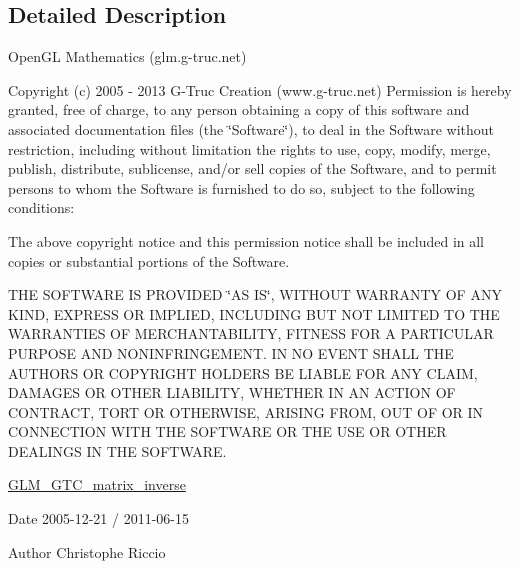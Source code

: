 \subsection{Detailed Description}
Open\+G\+L Mathematics (glm.\+g-\/truc.\+net)

Copyright (c) 2005 -\/ 2013 G-\/\+Truc Creation (www.\+g-\/truc.\+net) Permission is hereby granted, free of charge, to any person obtaining a copy of this software and associated documentation files (the \char`\"{}\+Software\char`\"{}), to deal in the Software without restriction, including without limitation the rights to use, copy, modify, merge, publish, distribute, sublicense, and/or sell copies of the Software, and to permit persons to whom the Software is furnished to do so, subject to the following conditions\+:

The above copyright notice and this permission notice shall be included in all copies or substantial portions of the Software.

T\+H\+E S\+O\+F\+T\+W\+A\+R\+E I\+S P\+R\+O\+V\+I\+D\+E\+D \char`\"{}\+A\+S I\+S\char`\"{}, W\+I\+T\+H\+O\+U\+T W\+A\+R\+R\+A\+N\+T\+Y O\+F A\+N\+Y K\+I\+N\+D, E\+X\+P\+R\+E\+S\+S O\+R I\+M\+P\+L\+I\+E\+D, I\+N\+C\+L\+U\+D\+I\+N\+G B\+U\+T N\+O\+T L\+I\+M\+I\+T\+E\+D T\+O T\+H\+E W\+A\+R\+R\+A\+N\+T\+I\+E\+S O\+F M\+E\+R\+C\+H\+A\+N\+T\+A\+B\+I\+L\+I\+T\+Y, F\+I\+T\+N\+E\+S\+S F\+O\+R A P\+A\+R\+T\+I\+C\+U\+L\+A\+R P\+U\+R\+P\+O\+S\+E A\+N\+D N\+O\+N\+I\+N\+F\+R\+I\+N\+G\+E\+M\+E\+N\+T. I\+N N\+O E\+V\+E\+N\+T S\+H\+A\+L\+L T\+H\+E A\+U\+T\+H\+O\+R\+S O\+R C\+O\+P\+Y\+R\+I\+G\+H\+T H\+O\+L\+D\+E\+R\+S B\+E L\+I\+A\+B\+L\+E F\+O\+R A\+N\+Y C\+L\+A\+I\+M, D\+A\+M\+A\+G\+E\+S O\+R O\+T\+H\+E\+R L\+I\+A\+B\+I\+L\+I\+T\+Y, W\+H\+E\+T\+H\+E\+R I\+N A\+N A\+C\+T\+I\+O\+N O\+F C\+O\+N\+T\+R\+A\+C\+T, T\+O\+R\+T O\+R O\+T\+H\+E\+R\+W\+I\+S\+E, A\+R\+I\+S\+I\+N\+G F\+R\+O\+M, O\+U\+T O\+F O\+R I\+N C\+O\+N\+N\+E\+C\+T\+I\+O\+N W\+I\+T\+H T\+H\+E S\+O\+F\+T\+W\+A\+R\+E O\+R T\+H\+E U\+S\+E O\+R O\+T\+H\+E\+R D\+E\+A\+L\+I\+N\+G\+S I\+N T\+H\+E S\+O\+F\+T\+W\+A\+R\+E.

\hyperlink{group__gtc__matrix__inverse}{G\+L\+M\+\_\+\+G\+T\+C\+\_\+matrix\+\_\+inverse}

\begin{DoxyDate}{Date}
2005-\/12-\/21 / 2011-\/06-\/15 
\end{DoxyDate}
\begin{DoxyAuthor}{Author}
Christophe Riccio 
\end{DoxyAuthor}
